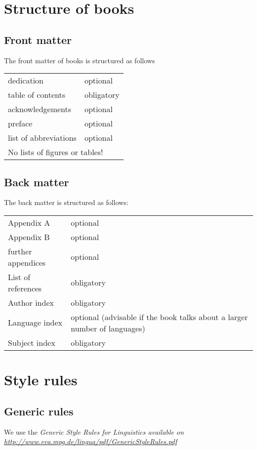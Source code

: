 \chapter{Structure of books}

\section{Front matter}

The front matter of \lsp books is structured as follows
\begin{table}[h]
\begin{tabular}{p{4cm}p{6cm}}
 dedication & optional\\
table of contents & obligatory\\ 
acknowledgements & optional\\
preface & optional\\
list of abbreviations & optional\\
\multicolumn{2}{l}{No lists of figures or tables!}\\
\end{tabular}
\end{table}
\section{Back matter}
The back matter is structured as follows:
\begin{table}[h]
\begin{tabular}{p{4cm}p{6cm}}
 Appendix A & optional \\
 Appendix B & optional \\
 further appendices & optional \\
 List of references & obligatory \\
 Author index & obligatory \\
 Language index  & optional (advisable if the book talks about a larger number of languages)\\
 Subject index & obligatory \\
\end{tabular}
 \end{table}


\chapter{Style rules}
\section{Generic rules}
We use the \em Generic Style Rules for Linguistics \em available on \url{http://www.eva.mpg.de/lingua/pdf/GenericStyleRules.pdf}

